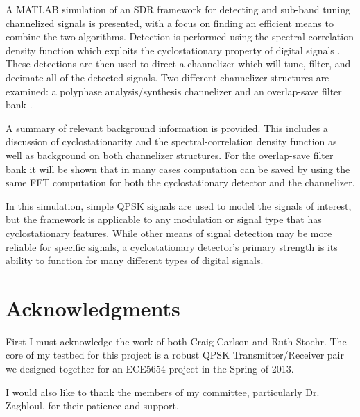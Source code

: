 \documentclass[12pt]{report}
\begin{document}
A MATLAB simulation of an SDR framework for detecting and sub-band tuning
channelized signals is presented, with a focus on finding an efficient means to
combine the two algorithms. Detection is performed using the
spectral-correlation density function which exploits the cyclostationary
property of digital signals \cite{Gardner1}.  These detections are then used to
direct a channelizer which will tune, filter, and decimate all of the detected
signals. Two different channelizer structures are examined: a polyphase
analysis/synthesis channelizer \cite{Harris1} and an overlap-save filter bank
\cite{Borgerding1}.

A summary of relevant background information is provided.  This includes
a discussion of cyclostationarity and the spectral-correlation density function
as well as background on both channelizer structures. For the overlap-save
filter bank it will be shown that in many cases computation can be saved by
using the same FFT computation for both the cyclostationary detector and the
channelizer.

In this simulation, simple QPSK signals are used to model the signals of
interest, but the framework is applicable to any modulation or signal type that
has cyclostationary features. While other means of signal detection may be more
reliable for specific signals, a cyclostationary detector's primary strength is
its ability to function for many different types of digital signals.


\vfill



\pagebreak

\chapter*{Acknowledgments}
First I must acknowledge the work of both Craig Carlson and Ruth Stoehr.
The core of my testbed for this project is a robust QPSK Transmitter/Receiver
pair we designed together for an ECE5654 project in the Spring of 2013.

I would also like to thank the members of my committee, particularly Dr.
Zaghloul, for their patience and support.
\end{document}
